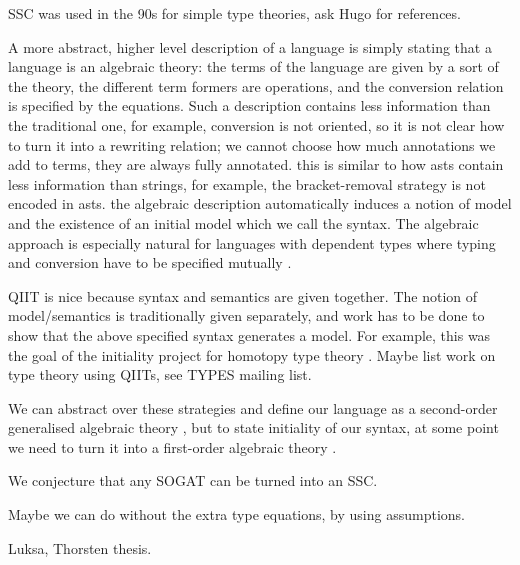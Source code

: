\documentclass[a4paper]{article}
\begin{document}
SSC was used in the 90s for simple type theories, ask Hugo for references.

A more abstract, higher level description of a language is simply
stating that a language is an algebraic theory: the terms of the
language are given by a sort of the theory, the different term formers
are operations, and the conversion relation is specified by the
equations. Such a description contains less information than the
traditional one, for example, conversion is not oriented, so it is not
clear how to turn it into a rewriting relation; we cannot choose how
much annotations we add to terms, they are always fully
annotated. this is similar to how asts contain less information than
strings, for example, the bracket-removal strategy is not encoded in
asts. the algebraic description automatically induces a notion of
model and the existence of an initial model
\cite{DBLP:journals/pacmpl/KaposiKA19} which we call the syntax. The
algebraic approach is especially natural for languages with dependent
types where typing and conversion have to be specified mutually
\cite{DBLP:conf/popl/AltenkirchK16}.

QIIT is nice because syntax and semantics are given together. The
notion of model/semantics is traditionally given separately, and work
has to be done to show that the above specified syntax generates a
model. For example, this was the goal of the initiality project for
homotopy type theory \cite{brunerie}. Maybe list work on type theory
using QIITs, see TYPES mailing list.

We can abstract over these strategies and define our language as a
second-order generalised algebraic theory
\cite{DBLP:journals/corr/abs-1904-04097}, but to state initiality of
our syntax, at some point we need to turn it into a first-order
algebraic theory \cite{DBLP:conf/fscd/BocquetKS23}.

We conjecture that any SOGAT can be turned into an SSC.

Maybe we can do without the extra type equations, by using assumptions.

Luksa, Thorsten thesis.

{}

\end{document}
